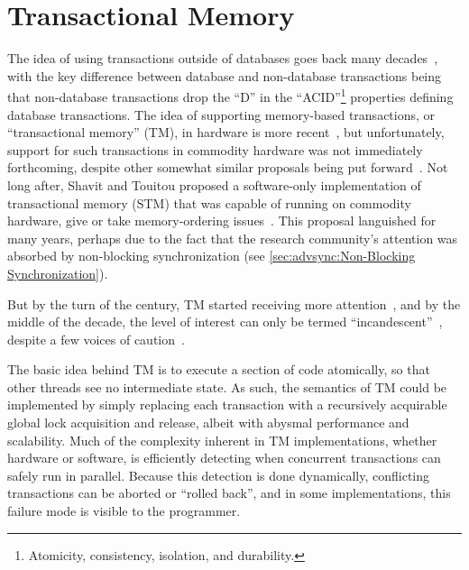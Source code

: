 
\section{Transactional Memory}
\label{sec:future:Transactional Memory}

The idea of using transactions outside of databases goes back many
decades~\cite{DBLomet1977SIGSOFT,Knight:1986:AMF:319838.319854,Herlihy93a},
with the key difference between
database and non-database transactions being that non-database transactions
drop the ``D'' in the ``ACID''\footnote{
	Atomicity, consistency, isolation, and durability.}
properties defining database transactions.
The idea of supporting memory-based transactions, or ``transactional memory''
(TM), in hardware
is more recent~\cite{Herlihy93a}, but unfortunately, support for such
transactions in commodity hardware was not immediately forthcoming,
despite other somewhat similar proposals being put forward~\cite{JMStone93}.
Not long after, Shavit and Touitou proposed a software-only implementation
of transactional memory (STM) that was capable of running on commodity
hardware, give or take memory-ordering issues~\cite{Shavit95}.
This proposal languished for many years, perhaps due to the fact that
the research community's attention was absorbed by non-blocking
synchronization (see \cref{sec:advsync:Non-Blocking Synchronization}).

But by the turn of the century, TM started receiving
more attention~\cite{Martinez01a,Rajwar01a}, and by the middle of the
decade, the level of interest can only be termed
``incandescent''~\cite{MauriceHerlihy2005-TM-manifesto.pldi,
DanGrossman2007TMGCAnalogy}, despite a few voices of
caution~\cite{Blundell2005DebunkTM,McKenney2007PLOSTM}.

The basic idea behind TM is to execute a section of
code atomically, so that other threads see no intermediate state.
As such, the semantics of TM could be implemented
by simply replacing each transaction with a recursively acquirable
global lock acquisition and release, albeit with abysmal performance
and scalability.
Much of the complexity inherent in TM implementations, whether hardware
or software, is efficiently detecting when concurrent transactions can safely
run in parallel.
Because this detection is done dynamically, conflicting transactions
can be aborted or ``rolled back'', and in some implementations, this
failure mode is visible to the programmer.

